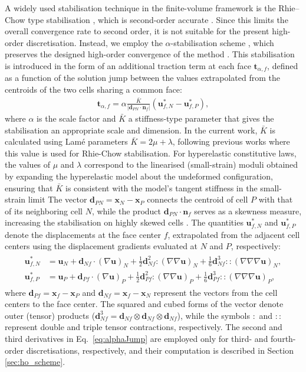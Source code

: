 \documentclass[sn-mathphys,Numbered]{sn-jnl}%
\newcommand{\bb}{\boldsymbol}
\begin{document}
A widely used stabilisation technique in the finite-volume framework is the Rhie–Chow type stabilisation \cite{Rhie1983}, which is second-order accurate \cite{Cardiff2025}.
Since this limits the overall convergence rate to second order, it is not suitable for the present high-order discretisation.
Instead, we employ the $\alpha$-stabilisation scheme \cite{Nishikawa2010}, which preserves the designed high-order convergence of the method \cite{Nishikawa2011, Nishikawa2025a}.
This stabilisation is introduced in the form of an additional traction term at each face $\bb{t}_{\alpha, f}$, defined as a function of the solution jump between the values extrapolated from the centroids of the two cells sharing a common face:
\begin{eqnarray}\label{eq:alpha}
\bb{t}_{\alpha, f} = \alpha \frac{\bar{K}}{|\bb{d}_{PN} \cdot \bb{n}_f|}(\bb{u}_{f,N}^*-\bb{u}_{f,P}^*),
\end{eqnarray}
%
where $\alpha$ is the scale factor and $\bar{K}$ a stiffness-type parameter that gives the stabilisation an appropriate scale and dimension.
In the current work, $\bar{K}$ is calculated using Lamé parameters $\bar{K} = 2\mu +\lambda$, following previous works \cite{Tukovic2013,Cardiff2017,Cardiff2018} where this value is used for Rhie-Chow stabilisation.
For hyperelastic constitutive laws, the values of $\mu$ and $\lambda$ correspond to the linearised (small-strain) moduli obtained by expanding the hyperelastic model about the undeformed configuration, ensuring that $\bar{K}$ is consistent with the model’s tangent stiffness in the small-strain limit
The vector $\bb{d}_{PN}=\bb{x}_N-\bb{x}_P$ connects the centroid of cell $P$ with that of its neighboring cell $N$,
while the product $\bb{d}_{PN} \cdot \bb{n}_f$ serves as a skewness measure, increasing the stabilisation on highly skewed cells \cite{Nishikawa2011}.
The quantities $\bb{u}_{f,N}^*$ and $\bb{u}_{f,P}^*$ denote the displacements at the face center $f$,
 extrapolated from the adjacent cell centers using the displacement gradients evaluated at $N$ and $P$, respectively:
\begin{eqnarray}\label{eq:alphaJump}
\begin{split}
\bb{u}_{f,N}^* &= \bb{u}_N + \bb{d}_{Nf} \cdot (\nabla \bb{u})_N + \frac{1}{2}\bb{d}_{Nf}^2 \!:\! (\nabla \nabla \bb{u})_N + \frac{1}{6}\bb{d}_{Nf}^3 \!::\! (\nabla \nabla \nabla \bb{u})_N, \\
\bb{u}_{f,P}^*& = \bb{u}_P + \bb{d}_{Pf} \cdot (\nabla \bb{u})_P + \frac{1}{2}\bb{d}_{Pf}^2 \!:\! (\nabla \nabla \bb{u})_P + \frac{1}{6}\bb{d}_{Pf}^3 \!::\! (\nabla \nabla \nabla \bb{u})_P,
\end{split}
\end{eqnarray}
where $\bb{d}_{Pf} = \bb{x}_f - \bb{x}_P$ and $\bb{d}_{Nf} = \bb{x}_f - \bb{x}_N$ represent the vectors from the cell centers to the face center.
The squared and cubed forms of the vector denote outer (tensor) products ($\bb{d}_{Nf}^3=\bb{d}_{Nf}\otimes \bb{d}_{Nf} \otimes  \bb{d}_{Nf}$), while the symbols $:$ and $\!::\!$ represent double and triple tensor contractions, respectively.
The second and third derivatives in Eq.~\eqref{eq:alphaJump} are employed only for third- and fourth-order discretisations, respectively, and their computation is described in Section \ref{sec:ho_scheme}.
\end{document}
